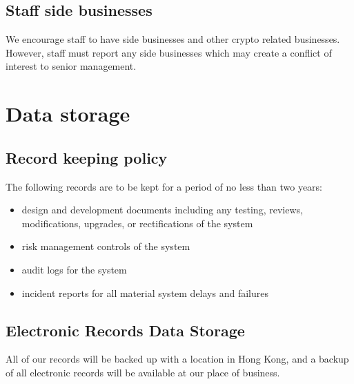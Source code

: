 \subsection{Staff side businesses}
We encourage staff to have side businesses and other crypto related
businesses.  However, staff must report any side businesses which may
create a conflict of interest to senior management.


\section{Data storage}
\subsection{Record keeping policy}
The following records are to be kept for a period of no less than two
years:
\begin{itemize}
  \item design and development documents including  any testing,
    reviews, modifications, upgrades, or rectifications of the system
  \item risk management controls of the system
    \item audit logs for the system
    \item incident reports for all material system delays and failures
\end{itemize}

\subsection{Electronic Records Data Storage}
All of our records will be backed up with a location in Hong Kong, and
a backup of all electronic records will be available at our place of business.
